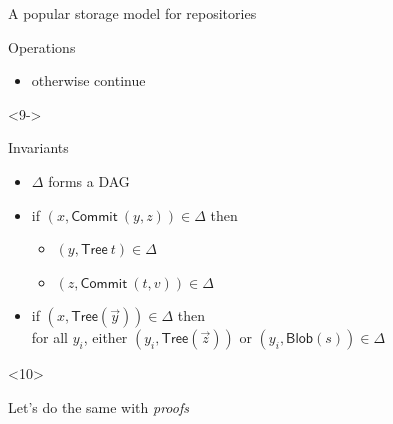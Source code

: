 \documentclass[ignorenonframetext,red]{beamer}
\begin{document}
\begin{frame}{A popular storage model for repositories}
\begin{onlyenv}
\begin{overlayarea}{\textwidth}{12em}
\begin{onlyenv}
\begin{block}{Operations}
\begin{description}
\begin{itemize}
            \item otherwise continue
            \end{itemize}
          \item[\dots]
          \end{description}
        \end{block}
      \end{onlyenv}
      \begin{onlyenv}<9->
        \begin{block}{Invariants}
          \begin{itemize}
          \item $\Delta$ forms a DAG
          \item if $(x, \mathsf{Commit}\ (y,z)) \in\Delta$ then
            \begin{itemize}
            \item $(y, \mathsf{Tree}\ t)\in\Delta$
            \item $(z, \mathsf{Commit}\ (t,v))\in\Delta$
            \end{itemize}
          \item if $(x, \mathsf{Tree}(\vec y))\in\Delta$ then \\
            for all $y_i$, either $(y_i, \mathsf{Tree}(\vec z))$ or
            $(y_i, \mathsf{Blob}(s))\in\Delta$
          \end{itemize}
        \end{block}
    \begin{onlyenv}<10>
      \begin{center}
        {\Large Let's do the same with \emph{proofs}}
      \end{center}
    \end{onlyenv}
      \end{onlyenv}
    \end{overlayarea}
  \end{onlyenv}
\end{frame}
\end{document}
